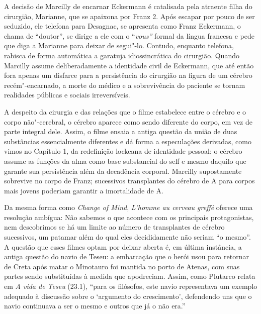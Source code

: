 A decisão de Marcilly de encarnar Eckermann é catalisada pela atraente
filha do cirurgião, Marianne, que se apaixona por Franz 2. Após escapar
por pouco de ser seduzido, ele telefona para Desagnac, se apresenta como
Franz Eckermann, o chama de ``doutor'', se dirige a ele com o
``\emph{vous''} formal da língua francesa e pede que diga a Marianne
para deixar de segui"-lo. Contudo, enquanto telefona, rabisca de forma
automática a garatuja idiossincrática do cirurgião. Quando Marcilly
assume deliberadamente a identidade civil de Eckermann, que até então
fora apenas um disfarce para a persistência do cirurgião na figura de um
cérebro recém"-encarnado, a morte do médico e a sobrevivência do paciente
se tornam realidades públicas e sociais irreversíveis.

A despeito da cirurgia e das relações que o filme estabelece entre o
cérebro e o corpo não"-cerebral, o cérebro aparece como sendo diferente
do corpo, em vez de parte integral dele. Assim, o filme ensaia a antiga
questão da união de duas substâncias essencialmente diferentes e dá
forma a especulações derivadas, como vimos no Capítulo 1, da redefinição
lockeana de identidade pessoal: o cérebro assume as funções da alma como
base substancial do self e mesmo daquilo que garante sua persistência
além da decadência corporal. Marcilly supostamente sobrevive no corpo de
Franz; sucessivos transplantes do cérebro de A para corpos mais jovens
poderiam garantir a imortalidade de A.

Da mesma forma como \emph{Change of Mind}, \emph{L'homme au cerveau
greffé} oferece uma resolução ambígua: Não sabemos o que acontece com os
principais protagonistas, nem descobrimos se há um limite ao número de
transplantes de cérebro sucessivos, um patamar além do qual eles
decididamente não seriam ``o mesmo''. A questão que esses filmes optam
por deixar aberta é, em última instância, a antiga questão do navio de
Teseu: a embarcação que o herói usou para retornar de Creta após matar o
Minotauro foi mantida no porto de Atenas, com suas partes sendo
substituídas à medida que apodreciam. Assim, como Plutarco relata em
\emph{A vida de Teseu} (23.1), ``para os filósofos, este navio
representava um exemplo adequado à discussão sobre o `argumento do
crescimento', defendendo uns que o navio continuava a ser o mesmo e
outros que já o não era.''


